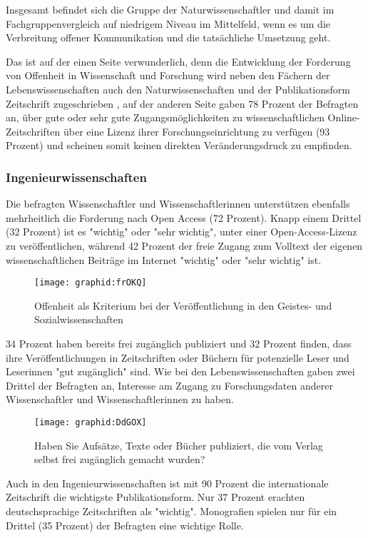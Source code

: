 Insgesamt befindet sich die Gruppe der Naturwissenschaftler und damit im Fachgruppenvergleich auf niedrigem Niveau im Mittelfeld, wenn es um die Verbreitung offener Kommunikation und die tatsächliche Umsetzung geht.

Das ist auf der einen Seite verwunderlich, denn die Entwicklung der Forderung von Offenheit in Wissenschaft und Forschung wird neben den Fächern der Lebenswissenschaften auch den Naturwissenschaften und der Publikationsform Zeitschrift zugeschrieben \cite{Naeder_2010}, auf der anderen Seite gaben 78 Prozent der Befragten an, über gute oder sehr gute Zugangsmöglichkeiten zu wissenschaftlichen Online-Zeitschriften über eine Lizenz ihrer Forschungseinrichtung zu verfügen (93 Prozent) und scheinen somit keinen direkten Veränderungsdruck zu empfinden.

\subsubsection{Ingenieurwissenschaften}

Die befragten Wissenschaftler und Wissenschaftlerinnen unterstützen ebenfalls mehrheitlich die Forderung nach Open Access (72 Prozent). Knapp einem Drittel (32 Prozent) ist es "wichtig" oder "sehr wichtig", unter einer Open-Access-Lizenz zu veröffentlichen, während 42 Prozent der freie Zugang zum Volltext der eigenen wissenschaftlichen Beiträge im Internet "wichtig" oder "sehr wichtig" ist.

\begin{figure}[h!]
\texttt{[image: graphid:frOKQ]}
\caption{Offenheit als Kriterium bei der Veröffentlichung in den Geistes- und Sozialwissenschaften}
\end{figure}

34 Prozent haben bereits frei zugänglich publiziert und 32 Prozent finden, dass ihre Veröffentlichungen in Zeitschriften oder Büchern für potenzielle Leser und Leserinnen "gut zugänglich" sind. Wie bei den Lebenswissenschaften gaben zwei Drittel der Befragten an, Interesse am Zugang zu Forschungsdaten anderer Wissenschaftler und Wissenschaftlerinnen zu haben.

\begin{figure}[h!]
\texttt{[image: graphid:DdGOX]}
\caption{Haben Sie Aufsätze, Texte oder Bücher publiziert, die vom Verlag selbst frei zugänglich gemacht wurden?}
\end{figure}

Auch in den Ingenieurwissenschaften ist mit 90 Prozent die internationale Zeitschrift die wichtigste Publikationsform. Nur 37 Prozent erachten deutschsprachige Zeitschriften als "wichtig". Monografien spielen nur für ein Drittel (35 Prozent) der Befragten eine wichtige Rolle.
